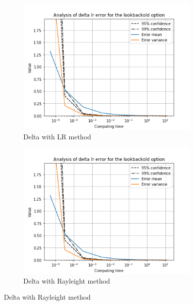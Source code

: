 \documentclass[11pt,a4paper,fleqn,draft]{article}
\begin{document}
 \begin{figure}[h!]
   \centering
      \begin{subfigure}[b]{0.45\textwidth}
           \includegraphics[width=\textwidth]{graphs/lookbackolddeltalrtime.png}
           \caption{Delta with LR method}
       \end{subfigure}
       \begin{subfigure}[b]{0.45\textwidth}
           \includegraphics[width=\textwidth]{graphs/lookbackolddeltalrtime.png}
           \caption{Delta with Rayleight method}
       \end{subfigure}


\end{figure}
\end{document}
